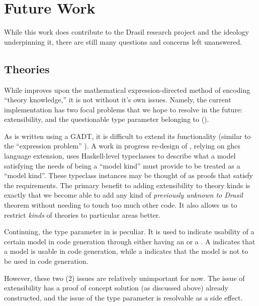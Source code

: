 \chapter{Future Work}
\label{chap:future-work}

While this work does contribute to the Drasil research project and the ideology
underpinning it, there are still many questions and concerns left unanswered.

\section{Theories}
\label{chap:futureWork:sec:theories}

While  improves upon the mathematical expression-directed
method of encoding ``theory knowledge,'' it is not without it's own issues.
Namely, the current implementation has two focal problems that we hope to
resolve in the future: extensibility, and the questionable type parameter
belonging to \ModelKind{} ().

As \ModelKinds{} is written using a GADT, it is difficult to extend its
functionality (similar to the ``expression problem''
\cite{Wadler1999ExpressionProblem}). A work in progress re-design of
\ModelKinds{} \cite{DrasilIssue2853AlternativeModelKinds}, relying on \acs{ghc}s
\ConstraintKinds{} \cite{GHC2020ConstraintKinds} language extension, uses
Haskell-level typeclasses to describe what a model satisfying the needs of being
a ``model kind'' must provide to be treated as a ``model kind''. These typeclass
instances may be thought of as proofs that satisfy the requirements. The primary
benefit to adding extensibility to theory kinds is exactly that we become able
to add any kind of \textit{previously unknown to Drasil} theorem without needing
to touch too much other code. It also allows us to restrict \textit{kinds} of
theories to particular areas better.

Continuing, the type parameter in \ModelKinds{} is peculiar. It is used to
indicate usability of a certain model in code generation through either having
an \Expr{} or a \ModelExpr{}. A  indicates that a model
is usable in code generation, while a  indicates
that the model is not to be used in code generation.

However, these two (2) issues are relatively unimportant for now. The issue of
extensibility has a proof of concept solution (as discussed above) already
constructed, and the issue of the type parameter is resolvable as a side effect.

